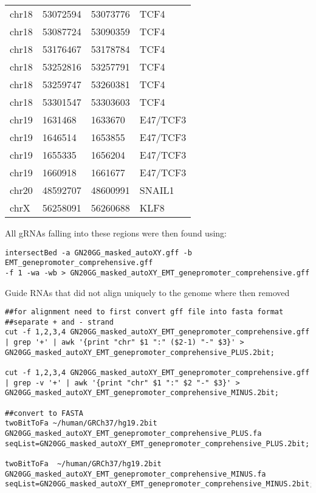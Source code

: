 \begin{footnotesize}
\begin{tabular}[H]{llll}
chr18 & 53072594 & 53073776	& TCF4 \\
chr18 & 53087724 & 53090359	& TCF4 \\
chr18 & 53176467 & 53178784	& TCF4 \\
chr18 & 53252816 & 53257791	& TCF4 \\
chr18 & 53259747 & 53260381	& TCF4 \\
chr18 & 53301547 & 53303603	& TCF4 \\
chr19 & 1631468	 & 1633670	& E47/TCF3 \\
chr19 & 1646514	 & 1653855	& E47/TCF3 \\
chr19 & 1655335	 & 1656204	& E47/TCF3 \\
chr19 & 1660918	 & 1661677	& E47/TCF3  \\
chr20 & 48592707 & 48600991 & SNAIL1  \\
chrX & 56258091 & 56260688 &KLF8 \\

\end{tabular}

All gRNAs falling into these regions were then found using:

\begin{lstlisting}
intersectBed -a GN20GG_masked_autoXY.gff -b EMT_genepromoter_comprehensive.gff
-f 1 -wa -wb > GN20GG_masked_autoXY_EMT_genepromoter_comprehensive.gff
\end{lstlisting}

Guide RNAs that did not align uniquely to the genome where then removed

\begin{lstlisting}
##for alignment need to first convert gff file into fasta format
##separate + and - strand
cut -f 1,2,3,4 GN20GG_masked_autoXY_EMT_genepromoter_comprehensive.gff | grep '+' | awk '{print "chr" $1 ":" ($2-1) "-" $3}' > GN20GG_masked_autoXY_EMT_genepromoter_comprehensive_PLUS.2bit;

cut -f 1,2,3,4 GN20GG_masked_autoXY_EMT_genepromoter_comprehensive.gff | grep -v '+' | awk '{print "chr" $1 ":" $2 "-" $3}' > GN20GG_masked_autoXY_EMT_genepromoter_comprehensive_MINUS.2bit;

##convert to FASTA
twoBitToFa ~/human/GRCh37/hg19.2bit GN20GG_masked_autoXY_EMT_genepromoter_comprehensive_PLUS.fa seqList=GN20GG_masked_autoXY_EMT_genepromoter_comprehensive_PLUS.2bit;

twoBitToFa  ~/human/GRCh37/hg19.2bit GN20GG_masked_autoXY_EMT_genepromoter_comprehensive_MINUS.fa seqList=GN20GG_masked_autoXY_EMT_genepromoter_comprehensive_MINUS.2bit;


\end{lstlisting}
\end{footnotesize}

